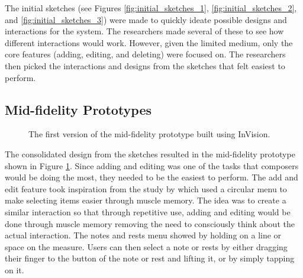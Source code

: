 			The initial sketches (see Figures \ref{fig:initial_sketches_1}, \ref{fig:initial_sketches_2}, and \ref{fig:initial_sketches_3}) were made to quickly ideate possible designs and interactions for the system. The researchers made several of these to see how different interactions would work. However, given the limited medium, only the core features (adding, editing, and deleting) were focused on. The researchers then picked the interactions and designs from the sketches that felt easiest to perform.

		\subsection{Mid-fidelity Prototypes}
		\label{sec:mid-fidelity-prototypes}

			\begin{figure}[H]
				\centering
			    \caption{The first version of the mid-fidelity prototype built using InVision.}
			    \label{fig:invision_v1}
			\end{figure} 

			The consolidated design from the sketches resulted in the mid-fidelity prototype shown in Figure \ref{fig:invision_v1}. Since adding and editing was one of the tasks that composers would be doing the most, they needed to be the easiest to perform. The add and edit feature took inspiration from the study by \citet{zhao2007earpod} which used a circular menu to make selecting items easier through muscle memory. The idea was to create a similar interaction so that through repetitive use, adding and editing would be done through muscle memory removing the need to consciously think about the actual interaction. The notes and rests menu showed by holding on a line or space on the measure. Users can then select a note or rests by either dragging their finger to the button of the note or rest and lifting it, or by simply tapping on it. 

